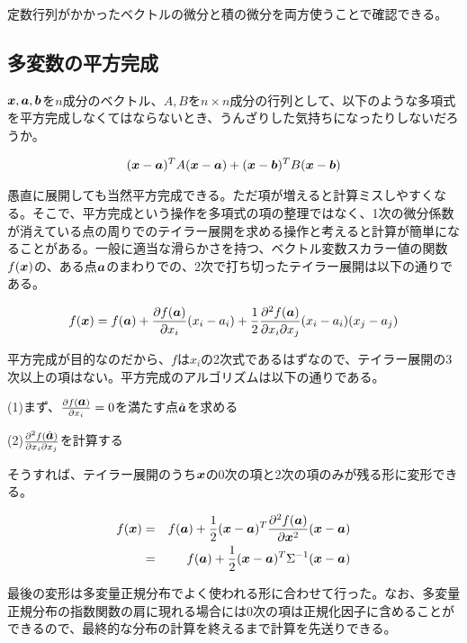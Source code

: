 \documentclass{jarticle}
\def\vec#1{\mbox{\boldmath $#1$}}
\begin{document}
定数行列がかかったベクトルの微分と積の微分を両方使うことで確認できる。


\subsection{多変数の平方完成}
$\vec{x},\vec{a},\vec{b}$を$n$成分のベクトル、$A, B$を$n\times n$成分の行列として、以下のような多項式を平方完成しなくてはならないとき、うんざりした気持ちになったりしないだろうか。

\begin{eqnarray}
(\vec{x}-\vec{a})^T A (\vec{x}-\vec{a}) + (\vec{x}-\vec{b})^T B (\vec{x}-\vec{b}) 
\end{eqnarray}

愚直に展開しても当然平方完成できる。ただ項が増えると計算ミスしやすくなる。そこで、平方完成という操作を多項式の項の整理ではなく、1次の微分係数が消えている点の周りでのテイラー展開を求める操作と考えると計算が簡単になることがある。一般に適当な滑らかさを持つ、ベクトル変数スカラー値の関数$f(\vec{x})$の、ある点$\vec{a}$のまわりでの、2次で打ち切ったテイラー展開は以下の通りである。

\begin{eqnarray}
f(\vec{x})=f(\vec{a})+\frac{\partial f(\vec{a})}{\partial x_i}(x_i -  a_i) + \frac{1}{2}\frac{\partial ^2 f(\vec{a})}{\partial x_i \partial x_j}(x_i -  a_i)(x_j -  a_j) 
\end{eqnarray}

平方完成が目的なのだから、$f$は$x_i$の2次式であるはずなので、テイラー展開の3次以上の項はない。平方完成のアルゴリズムは以下の通りである。

(1)まず、$\frac{\partial f(\vec{a})}{\partial x_i}=0$を満たす点$\hat{\vec{a}}$を求める

(2)$\frac{\partial ^2 f(\hat{\vec{a}})}{\partial x_i \partial x_j}$を計算する

そうすれば、テイラー展開のうち$\vec{x}$の0次の項と2次の項のみが残る形に変形できる。

\begin{eqnarray}
f(\vec{x}) &=& f(\vec{a}) + \frac{1}{2} (\vec{x}-\vec{a}) ^T \frac{\partial ^2 f(\vec{a})}{\partial \vec{x} ^2} (\vec{x}-\vec{a}) \\
&=&f(\vec{a}) + \frac{1}{2} (\vec{x}-\vec{a}) ^T \Sigma ^{-1} (\vec{x}-\vec{a})
\end{eqnarray}

最後の変形は多変量正規分布でよく使われる形に合わせて行った。なお、多変量正規分布の指数関数の肩に現れる場合には0次の項は正規化因子に含めることができるので、最終的な分布の計算を終えるまで計算を先送りできる。
\end{document}

